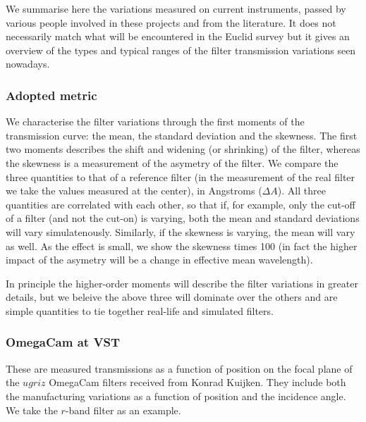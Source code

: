\documentclass{article}
\begin{document}
We summarise here the variations measured on current instruments, passed
by various people involved in these projects and from the literature. It
does not necessarily match what will be encountered in the Euclid survey
but it gives an overview of the types and typical ranges of the filter
transmission variations seen nowadays.

\hypertarget{adopted-metric}{%
\subsubsection{Adopted metric}\label{adopted-metric}}

We characterise the filter variations through the first moments of the
transmission curve: the mean, the standard deviation and the skewness.
The first two moments describes the shift and widening (or shrinking) of
the filter, whereas the skewness is a measurement of the asymetry of the
filter. We compare the three quantities to that of a reference filter
(in the measurement of the real filter we take the values measured at
the center), in Angstroms (\(\Delta A\)). All three quantities are
correlated with each other, so that if, for example, only the cut-off of
a filter (and not the cut-on) is varying, both the mean and standard
deviations will vary simulatenously. Similarly, if the skewness is
varying, the mean will vary as well. As the effect is small, we show the
skewness times 100 (in fact the higher impact of the asymetry will be a
change in effective mean wavelength).

In principle the higher-order moments will describe the filter
variations in greater details, but we beleive the above three will
dominate over the others and are simple quantities to tie together
real-life and simulated filters.


    \hypertarget{omegacam-at-vst}{%
\subsubsection{OmegaCam at VST}\label{omegacam-at-vst}}

These are measured transmissions as a function of position on the focal
plane of the \(ugriz\) OmegaCam filters received from Konrad Kuijken.
They include both the manufacturing variations as a function of position
and the incidence angle. We take the \(r\)-band filter as an example.


    \begin{center}
    \end{center}
    { \hspace*{\fill} \\}
    
\end{document}
